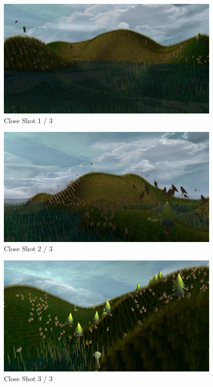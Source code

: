 \documentclass{article}
\begin{document}
    \begin{figure}
        \centering
        \includegraphics[width=\textwidth]{../screenshots/close1.jpg}
        \caption{Close Shot 1 / 3} \label{fig:screenshot-close-1}
    \end{figure}
    \begin{figure}
        \centering
        \includegraphics[width=\textwidth]{../screenshots/close2.jpg}
        \caption{Close Shot 2 / 3} \label{fig:screenshot-close-2}
    \end{figure}
    \begin{figure}
        \centering
        \includegraphics[width=\textwidth]{../screenshots/close3.jpg}
        \caption{Close Shot 3 / 3} \label{fig:screenshot-close-3}
    \end{figure}
\end{document}
